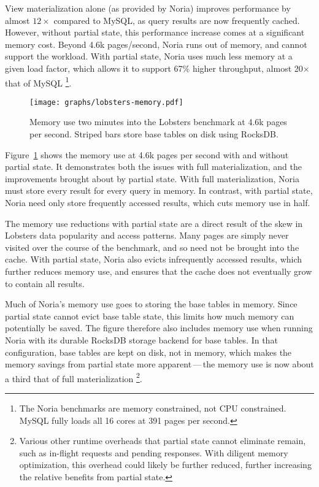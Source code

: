 View materialization alone (as provided by Noria) improves performance by almost
$12\times$ compared to MySQL, as query results are now frequently cached.
However, without partial state, this performance increase comes at a significant
memory cost. Beyond 4.6k pages/second, Noria runs out of memory, and cannot
support the workload. With partial state, Noria uses much less memory at a given
load factor, which allows it to support 67\% higher throughput, almost
20$\times$ that of MySQL%
\footnote{The Noria benchmarks are memory constrained, not CPU constrained.
MySQL fully loads all 16 cores at 391 pages per second.}.

\begin{figure}[h]
  \centering
  \texttt{[image: graphs/lobsters-memory.pdf]}
  \caption{Memory use two minutes into the Lobsters benchmark at 4.6k pages per
  second. Striped bars store base tables on disk using RocksDB.}
  \label{f:lobsters-memory}
\end{figure}

Figure~\ref{f:lobsters-memory} shows the memory use at 4.6k pages per second
with and without partial state. It demonstrates both the issues with full
materialization, and the improvements brought about by partial state. With full
materialization, Noria must store every result for every query in memory. In
contrast, with partial state, Noria need only store frequently accessed results,
which cuts memory use in half.

The memory use reductions with partial state are a direct result of the skew in
Lobsters data popularity and access patterns. Many pages are simply never
visited over the course of the benchmark, and so need not be brought into the
cache. With partial state, Noria also evicts infrequently accessed results,
which further reduces memory use, and ensures that the cache does not eventually
grow to contain all results.

Much of Noria's memory use goes to storing the base tables in memory. Since
partial state cannot evict base table state, this limits how much memory can
potentially be saved. The figure therefore also includes memory use when running
Noria with its durable RocksDB storage backend for base tables. In that
configuration, base tables are kept on disk, not in memory, which makes the
memory savings from partial state more apparent\,---\,the memory use is now
about a third that of full materialization%
\footnote{Various other runtime overheads that partial state cannot eliminate
remain, such as in-flight requests and pending responses. With diligent memory
optimization, this overhead could likely be further reduced, further increasing
the relative benefits from partial state.}.

